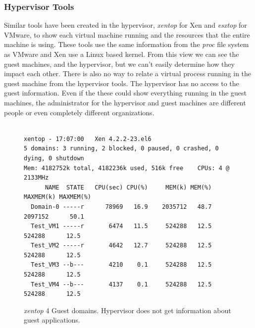 \subsubsection{Hypervisor Tools}
Similar tools have been created in the hypervisor, \emph{xentop} for Xen and \emph{esxtop} for VMware, to show each virtual machine running and the resources that the entire machine is using.  
These tools use the same information from the \emph{proc} file system as VMware and Xen use a Linux based kernel.  
From this view we can see the guest machines, and the hypervisor, but we can't easily determine how they impact each other.  There is also no way to relate a virtual process running in the guest machine from the hypervisor tools.  The hypervisor has no access to the guest information.
Even if the these could show everything running in the guest machines, the administrator for the hypervisor and guest machines are different people or even completely different organizations. 

\begin{figure}[h]
\begingroup
    \fontsize{10pt}{12pt}\selectfont
\begin{Verbatim}

xentop - 17:07:00   Xen 4.2.2-23.el6
5 domains: 3 running, 2 blocked, 0 paused, 0 crashed, 0 dying, 0 shutdown
Mem: 4182752k total, 4182236k used, 516k free    CPUs: 4 @ 2133MHz
      NAME  STATE   CPU(sec) CPU(%)     MEM(k) MEM(%)  MAXMEM(k) MAXMEM(%) 
  Domain-0 -----r      78969   16.9    2035712   48.7    2097152      50.1    
  Test_VM1 -----r       6474   11.5     524288   12.5     524288      12.5     
  Test_VM2 -----r       4642   12.7     524288   12.5     524288      12.5 
  Test_VM3 --b---       4210    0.1     524288   12.5     524288      12.5     
  Test_VM4 --b---       4137    0.1     524288   12.5     524288      12.5  
\end{Verbatim}
\endgroup
\caption{\emph{xentop} 4 Guest domains. Hypervisor does not get information about guest applications.}
\label{fig:xentop}
\end{figure}

